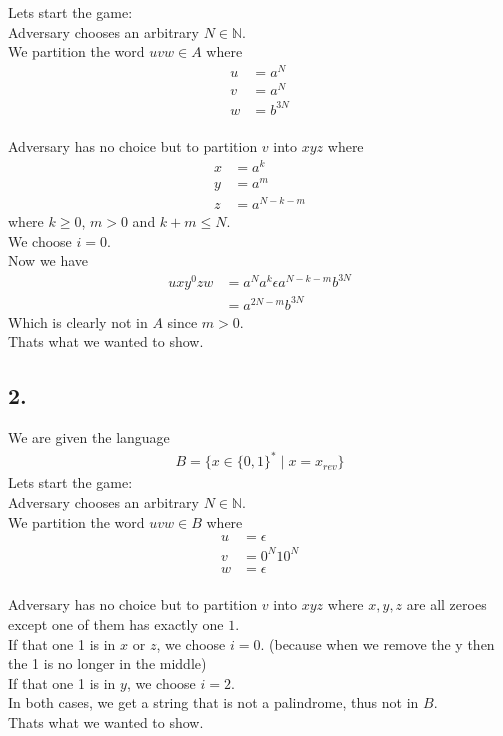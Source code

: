 \documentclass{article}
\begin{document}
Lets start the game: \\
Adversary chooses an arbitrary \(N \in \mathbb{N}\). \\
We partition the word \(uvw \in A\) where
\begin{align*}
   u &= a^{N} \\
   v &= a^{N} \\
   w &= b^{3N}
\end{align*}
\\
Adversary has no choice but to partition \(v\) into \(xyz\) where
\begin{align*}
   x &= a^{k} \\
   y &= a^{m} \\
   z &= a^{N - k - m}
\end{align*}
where \(k \geq 0\), \(m > 0\) and \(k + m \leq N\). \\
We choose \(i = 0\). \\
Now we have
\begin{align*}
   u x y^0 z w &= a^{N} a^{k} \epsilon a^{N - k - m} b^{3N} \\
               &= a^{2N - m} b^{3N}
\end{align*}
Which is clearly not in \(A\) since \(m > 0\). \\
Thats what we wanted to show.

\subsection*{2.}
We are given the language
\begin{align*}
   B = \{x \in \{0, 1\}^* \mid x = x_{rev}\}
\end{align*}
Lets start the game: \\
Adversary chooses an arbitrary \(N \in \mathbb{N}\). \\
We partition the word \(uvw \in B\) where
\begin{align*}
   u &= \epsilon \\
   v &= 0^{N}10^{N} \\
   w &= \epsilon
\end{align*}
\\
Adversary has no choice but to partition \(v\) into \(xyz\) where \(x, y, z\) are all zeroes except one of them has exactly one \(1\). \\
If that one 1 is in \(x\) or \(z\), we choose \(i = 0\). (because when we remove the y then the 1 is no longer in the middle) \\
If that one 1 is in \(y\), we choose \(i = 2\). \\
In both cases, we get a string that is not a palindrome, thus not in \(B\). \\
Thats what we wanted to show.
\end{document}
